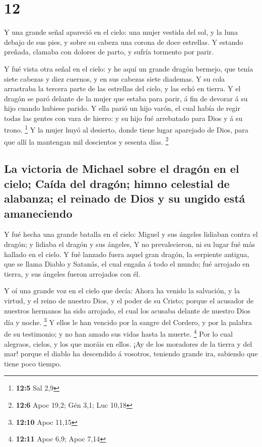 \hypertarget{section-11}{%
\section{12}\label{section-11}}

 Y una grande señal apareció en el cielo: una mujer
vestida del sol, y la luna debajo de sus pies, y sobre su cabeza una
corona de doce estrellas.  Y estando preñada, clamaba con
dolores de parto, y sufría tormento por parir.

 Y fué vista otra señal en el cielo: y he aquí un grande
dragón bermejo, que tenía siete cabezas y diez cuernos, y en sus cabezas
siete diademas.  Y su cola arrastraba la tercera parte de
las estrellas del cielo, y las echó en tierra. Y el dragón se paró
delante de la mujer que estaba para parir, á fin de devorar á su hijo
cuando hubiese parido.  Y ella parió un hijo varón, el
cual había de regir todas las gentes con vara de hierro: y su hijo fué
arrebatado para Dios y á su trono. \footnote{\textbf{12:5} Sal 2,9}
 Y la mujer huyó al desierto, donde tiene lugar aparejado
de Dios, para que allí la mantengan mil doscientos y sesenta días.
\footnote{\textbf{12:6} Apoc 19,2; Gén 3,1; Luc 10,18}

\hypertarget{la-victoria-de-michael-sobre-el-draguxf3n-en-el-cielo-cauxedda-del-draguxf3n-himno-celestial-de-alabanza-el-reinado-de-dios-y-su-ungido-estuxe1-amaneciendo}{%
\subsection{La victoria de Michael sobre el dragón en el cielo; Caída
del dragón; himno celestial de alabanza; el reinado de Dios y su ungido
está
amaneciendo}\label{la-victoria-de-michael-sobre-el-draguxf3n-en-el-cielo-cauxedda-del-draguxf3n-himno-celestial-de-alabanza-el-reinado-de-dios-y-su-ungido-estuxe1-amaneciendo}}

 Y fué hecha una grande batalla en el cielo: Miguel y sus
ángeles lidiaban contra el dragón; y lidiaba el dragón y sus ángeles,
 Y no prevalecieron, ni su lugar fué más hallado en el
cielo.  Y fué lanzado fuera aquel gran dragón, la
serpiente antigua, que se llama Diablo y Satanás, el cual engaña á todo
el mundo; fué arrojado en tierra, y sus ángeles fueron arrojados con él.

 Y oí una grande voz en el cielo que decía: Ahora ha
venido la salvación, y la virtud, y el reino de nuestro Dios, y el poder
de su Cristo; porque el acusador de nuestros hermanos ha sido arrojado,
el cual los acusaba delante de nuestro Dios día y noche. \footnote{\textbf{12:10}
  Apoc 11,15}  Y ellos le han vencido por la sangre del
Cordero, y por la palabra de su testimonio; y no han amado sus vidas
hasta la muerte. \footnote{\textbf{12:11} Apoc 6,9; Apoc 7,14}
 Por lo cual alegraos, cielos, y los que moráis en ellos.
¡Ay de los moradores de la tierra y del mar! porque el diablo ha
descendido á vosotros, teniendo grande ira, sabiendo que tiene poco
tiempo.

